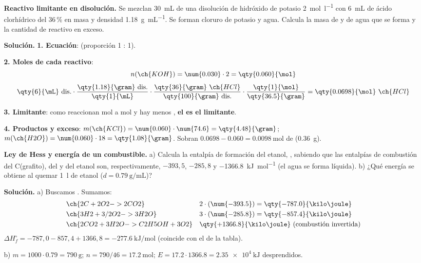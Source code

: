 \begin{example}
    \textbf{Reactivo limitante en disolución.} Se mezclan \qty{30}{\mL} de una disolución de hidróxido de potasio
    \qty{2}{\mol\per\litre} con \qty{6}{\mL} de ácido clorhídrico del 36\,\% en masa y densidad \qty{1.18}{\gram\per\mL}. Se forman
    cloruro de potasio y agua. Calcula la masa de  y de agua que se forma y la cantidad de reactivo en exceso.

    \textbf{Solución.} \textbf{1. Ecuación}:  (proporción 1 : 1).

    \textbf{2. Moles de cada reactivo}:
    \[ n(\ch{KOH}) = \num{0.030} \cdot 2 = \qty{0.060}{\mol} \]
    \[ \qty{6}{\mL}\ \text{dis.} \cdot \frac{\qty{1.18}{\gram}\ \text{dis.}}{\qty{1}{\mL}} \cdot \frac{\qty{36}{\gram}\ \ch{HCl}}{\qty{100}{\gram}\ \text{dis.}}
    \cdot \frac{\qty{1}{\mol}}{\qty{36.5}{\gram}} = \qty{0.0698}{\mol}\ \ch{HCl} \]

    \textbf{3. Limitante}: como reaccionan mol a mol y hay menos , \textbf{el  es el limitante}.

    \textbf{4. Productos y exceso}: \(m(\ch{KCl}) = \num{0.060} \cdot \num{74.6} = \qty{4.48}{\gram}\);
    \(m(\ch{H2O}) = \num{0.060} \cdot 18 = \qty{1.08}{\gram}\). Sobran \(\num{0.0698} - \num{0.060} = \qty{0.0098}{\mol}\) de 
    (\qty{0.36}{\gram}).
\end{example}

\begin{example}
    \textbf{Ley de Hess y energía de un combustible.} a) Calcula la entalpía de formación del etanol, , sabiendo
    que las entalpías de combustión del C(grafito), del  y del etanol son, respectivamente, \(-393{,}5\), \(-285{,}8\) y
    \qty{-1366.8}{\kilo\joule\per\mol} (el agua se forma líquida). b) ¿Qué energía se obtiene al quemar \qty{1}{\litre} de etanol
    (\(d = \qty{0.79}{\gram\per\mL}\))?

    \textbf{Solución.} a) Buscamos . Sumamos:
    \[ \begin{aligned}
        &\ch{2 C + 2 O2 -> 2 CO2} && 2 \cdot (\num{-393.5}) = \qty{-787.0}{\kilo\joule} \\
        &\ch{3 H2 + 3/2 O2 -> 3 H2O} && 3 \cdot (\num{-285.8}) = \qty{-857.4}{\kilo\joule} \\
        &\ch{2 CO2 + 3 H2O -> C2H5OH + 3 O2} && \qty{+1366.8}{\kilo\joule} \text{ (combustión invertida)}
    \end{aligned} \]
    \(\Delta H_f^\circ = -787{,}0 - 857{,}4 + 1366{,}8 = \qty{-277.6}{\kilo\joule\per\mol}\) (coincide con el de la tabla).

    b) \(m = 1000 \cdot \num{0.79} = \qty{790}{\gram}\); \(n = 790/46 = \qty{17.2}{\mol}\);
    \(E = \num{17.2} \cdot \num{1366.8} = \qty{2.35e4}{\kilo\joule}\) desprendidos.
\end{example}

